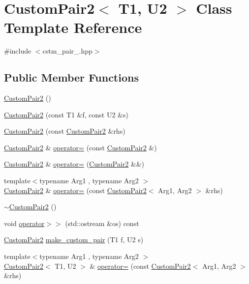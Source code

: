 \hypertarget{classCustomPair2}{}\section{Custom\+Pair2$<$ T1, U2 $>$ Class Template Reference}
\label{classCustomPair2}


{\ttfamily \#include $<$cstm\+\_\+pair\+\_.\+hpp$>$}

\subsection*{Public Member Functions}
\begin{DoxyCompactItemize}
\item 
\hyperlink{classCustomPair2_a736df3b473094a2ad25aea58362db38b}{Custom\+Pair2} ()
\item 
\hyperlink{classCustomPair2_a917f5f777f4fea2a9dc70e79394624a7}{Custom\+Pair2} (const T1 \&f, const U2 \&s)
\item 
\hyperlink{classCustomPair2_a726068d9ffb66e66aff43501b4272179}{Custom\+Pair2} (const \hyperlink{classCustomPair2}{Custom\+Pair2} \&rhs)
\item 
\hyperlink{classCustomPair2}{Custom\+Pair2} \& \hyperlink{classCustomPair2_af3b1fa5b7441355be8bfa96d089ab37b}{operator=} (const \hyperlink{classCustomPair2}{Custom\+Pair2} \&)
\item 
\hyperlink{classCustomPair2}{Custom\+Pair2} \& \hyperlink{classCustomPair2_a5ae55c15931cd1a095a8fad4bcde724c}{operator=} (\hyperlink{classCustomPair2}{Custom\+Pair2} \&\&)
\item 
{\footnotesize template$<$typename Arg1 , typename Arg2 $>$ }\\\hyperlink{classCustomPair2}{Custom\+Pair2} \& \hyperlink{classCustomPair2_af68d83bfd286f5e0d7114d62a2dcc43e}{operator=} (const \hyperlink{classCustomPair2}{Custom\+Pair2}$<$ Arg1, Arg2 $>$ \&rhs)
\item 
\hyperlink{classCustomPair2_a2f6ff855e4378a0ae55fa0f74bb21219}{$\sim$\+Custom\+Pair2} ()
\item 
void \hyperlink{classCustomPair2_a6636532dcffffc8d3d8a4568fef36de4}{operator$>$$>$} (std\+::ostream \&os) const 
\item 
\hyperlink{classCustomPair2}{Custom\+Pair2} \hyperlink{classCustomPair2_a976ab888244d80a6020b34f3c3ff124f}{make\+\_\+custom\+\_\+pair} (T1 f, U2 s)
\item 
{\footnotesize template$<$typename Arg1 , typename Arg2 $>$ }\\\hyperlink{classCustomPair2}{Custom\+Pair2}$<$ T1, U2 $>$ \& \hyperlink{classCustomPair2_afeb8043ca6439aa32647cb3d5e6e7cd0}{operator=} (const \hyperlink{classCustomPair2}{Custom\+Pair2}$<$ Arg1, Arg2 $>$ \&rhs)
\end{DoxyCompactItemize}
